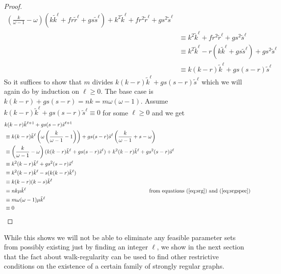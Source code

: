 \documentclass[12pt]{report}
\theoremstyle{definition}
\begin{document}
\begin{proof}
\begin{align*}
        \left(\frac{k}{\omega-1}-\omega\right)(k\tilde{k}^\ell+fr\tilde{r}^\ell+gs\tilde{s}^\ell)+k^2\tilde{k}^\ell+fr^2\tilde{r}^\ell+gs^2\tilde{s}^\ell \\ & \equiv
        k^2\tilde{k}^\ell+fr^2\tilde{r}^\ell+gs^2\tilde{s}^\ell \\ & \equiv
        k^2\tilde{k}^\ell-r(k\tilde{k}^\ell+gs\tilde{s}^\ell)+gs^2\tilde{s}^\ell \\ & \equiv 
        k(k-r)\tilde{k}^\ell+gs(s-r)\tilde{s}^\ell
    \end{align*}
    So it suffices to show that $m$ divides $k(k-r)\tilde{k}^\ell+gs(s-r)\tilde{s}^\ell$ which we will again do by induction on $\ell \geq 0$. The base case is $k(k-r)+gs(s-r)=nk = m\omega(\omega-1)$. Assume $k(k-r)\tilde{k}^\ell+gs(s-r)\tilde{s}^\ell \equiv 0$ for some $\ell \geq 0$ and we get 
    \begin{align*}
        & k(k-r)\tilde{k}^{\ell +1}+gs(s-r)\tilde{s}^{\ell +1} \\ & \equiv
        k(k-r)\tilde{k}^\ell\left(\omega\left(\frac{k}{\omega -1} -1\right)\right)+gs(s-r)\tilde{s}^\ell\left(\frac{k}{\omega -1} +s - \omega\right) \\ & \equiv
        \left(\frac{k}{\omega -1}-\omega\right)(k(k-r)\tilde{k}^\ell+gs(s-r)\tilde{s}^\ell)+k^2(k-r)\tilde{k}^\ell+gs^2(s-r)\tilde{s}^\ell \\ & \equiv
        k^2(k-r)\tilde{k}^\ell+gs^2(s-r)\tilde{s}^\ell \\ & \equiv
        k^2(k-r)\tilde{k}^\ell-s(k(k-r)\tilde{k}^\ell) \\ & \equiv
        k(k-r)(k-s)\tilde{k}^\ell \\ &\equiv nk\mu\tilde{k}^\ell \hspace{8cm}\mbox{from equations (\ref{eq:srg}) and (\ref{eq:srgspec})}\\ & \equiv m\omega(\omega-1)\mu\tilde{k}^\ell \\ & \equiv 0
    \end{align*}
\end{proof}
While this shows we will not be able to eliminate any feasible parameter sets from possibly existing just by finding an integer $\ell$, we show in the next section that the fact about walk-regularity can be used to find other restrictive conditions on the existence of a certain family of strongly regular graphs.
\end{document}
